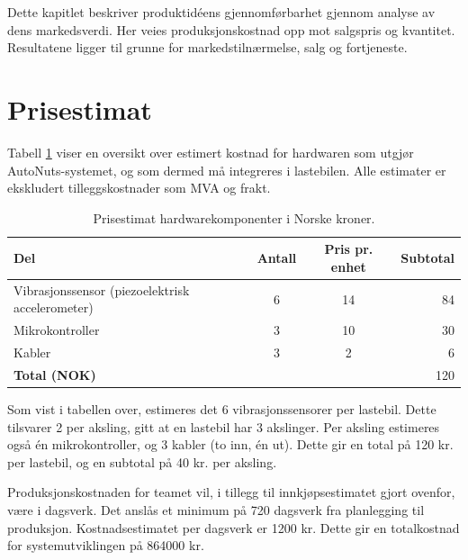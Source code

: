 Dette kapitlet beskriver produktidéens gjennomførbarhet gjennom analyse av 
dens markedsverdi. Her veies produksjonskostnad opp mot salgspris og kvantitet.
Resultatene ligger til grunne for markedstilnærmelse, salg og fortjeneste.

\section{Prisestimat}
Tabell \ref{tab:price-HW} viser en oversikt over estimert kostnad for 
hardwaren som utgjør AutoNuts-systemet, og som dermed må integreres i lastebilen. Alle estimater er ekskludert tilleggskostnader som MVA og frakt.
\newline
\begin{table}[H]
\caption{Prisestimat hardwarekomponenter i Norske kroner.}
\label{tab:price-HW}
\begin{tabularx}{\textwidth}{lcc|r}
	{\bf Del} & {\bf Antall} & {\bf Pris pr. enhet} & {\bf Subtotal}\\
	\hline
	Vibrasjonssensor (piezoelektrisk accelerometer) & 6 & 14 & 84\\
	Mikrokontroller & 3 & 10 & 30\\
	Kabler & 3 & 2 & 6\\
	\hline
	\multicolumn{3}{l}{{\bf Total (NOK)}} &\multicolumn{1}{r}{120}\\
	\hline \hline
\end{tabularx}
\end{table}

Som vist i tabellen over, estimeres det 6 vibrasjonssensorer per lastebil. Dette
tilsvarer 2 per aksling, gitt at en lastebil har 3 akslinger. Per aksling 
estimeres også én mikrokontroller, og 3 kabler (to inn, én ut). Dette gir en 
total på 120 kr. per lastebil, og en subtotal på 40 kr. per aksling.

Produksjonskostnaden for teamet vil, i tillegg til innkjøpsestimatet gjort 
ovenfor, være i dagsverk. Det anslås et minimum på 720 dagsverk fra 
planlegging til produksjon. Kostnadsestimatet per dagsverk er 1200 kr. Dette gir en totalkostnad for systemutviklingen på 864000 kr.

